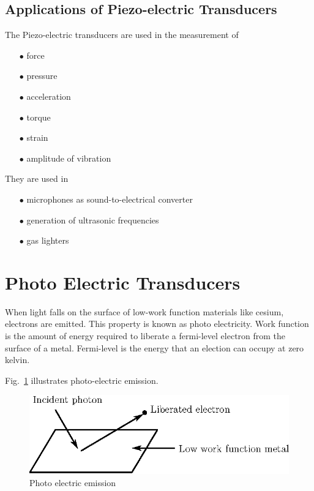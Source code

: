 \eject

\subsection{Applications of Piezo-electric Transducers}\label{sec8.14.2}

The Piezo-electric transducers are used in the measurement of
\begin{itemize}
\itemsep=0pt
\item[$\bullet$] force

\item[$\bullet$] pressure

\item[$\bullet$] acceleration

\item[$\bullet$] torque

\item[$\bullet$] strain

\item[$\bullet$] amplitude of vibration
\end{itemize}
They are used in
\begin{itemize}
\item[$\bullet$] microphones as sound-to-electrical converter 

\item[$\bullet$] generation of ultrasonic frequencies

\item[$\bullet$] gas lighters
\end{itemize}

\section{Photo Electric Transducers}\label{sec8.15}

When light falls on the surface of low-work function materials like cesium, electrons are emitted. This property is known as photo electricity. Work function is the amount of energy required to liberate a fermi-level electron from the surface of a metal. Fermi-level is the energy that an election can occupy at zero kelvin.

Fig.~\ref{fig8.24} illustrates photo-electric emission. 
\begin{figure}[H]
\centering
\includegraphics{chap8/fig8.24.eps}
\caption{Photo electric emission}\label{fig8.24}
\end{figure}

